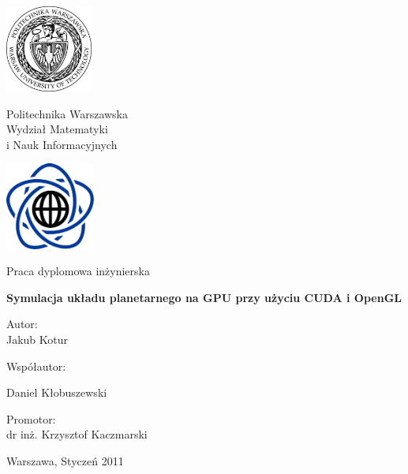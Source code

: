 \thispagestyle{empty}
\begin{center}
\Large

\begin{minipage}{0.2\linewidth}
\centering
\includegraphics[height=2.86cm]{img/logo_pw.pdf}
\end{minipage}
\begin{minipage}{0.55\linewidth}
\centering
Politechnika Warszawska \\[0.5em] Wydział Matematyki \\ i Nauk Informacyjnych
\end{minipage}
\begin{minipage}{0.2\linewidth}
\centering
\includegraphics[height=2.86cm]{img/logo_mini.pdf}
\end{minipage}

\vspace{2em}
Praca dyplomowa inżynierska
\vspace{5em}

\huge
\textbf{Symulacja układu planetarnego na GPU przy użyciu CUDA i OpenGL}

\large

\vspace{4em}

\hfill
\begin{minipage}{0.4\linewidth}
Autor:
\vspace{0.5em}
\\
Jakub Kotur

\vspace{1em}

Współautor:

\vspace{0.5em}
Daniel Kłobuszewski

\vspace{1em}

Promotor:
\vspace{0.5em}
\\
dr inż. Krzysztof Kaczmarski
\end{minipage}

\vfill
Warszawa, Styczeń 2011
\end{center}

